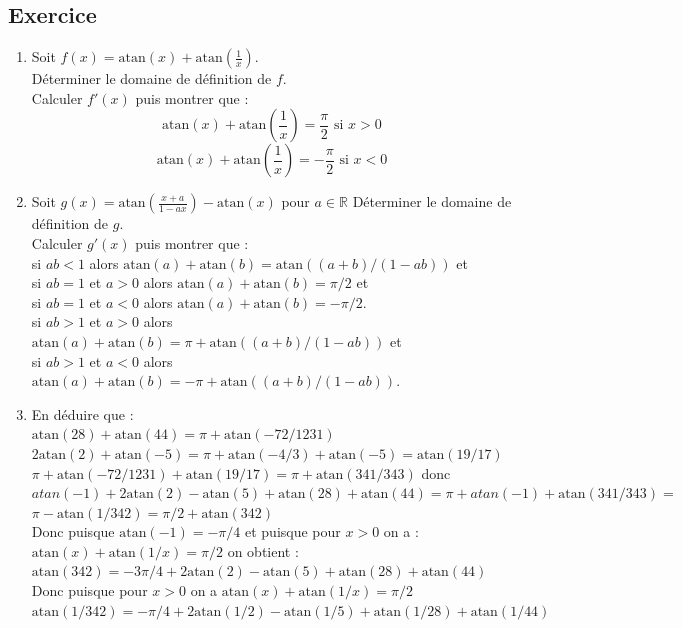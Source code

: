 \documentclass[a4paper,11pt]{book}
\newcommand{\R}{{\mathbb{R}}}
\newcommand{\atan}{\mbox{atan}}
\begin{document}
\subsection{Exercice}
\begin{enumerate}
\item Soit $f(x)=\atan(x)+\atan(\frac{1}{x})$.\\
D\'eterminer le domaine de d\'efinition de $f$.\\
Calculer $f'(x)$ puis montrer que :
$$\atan(x)+\atan(\frac{1}{x})=\frac{\pi}{2} \mbox{ si } x>0$$
$$\atan(x)+\atan(\frac{1}{x})=-\frac{\pi}{2} \mbox{ si } x<0$$
\item Soit $g(x)=\atan(\frac{x+a}{1-ax})-\atan(x)$ pour $a\in \R$
D\'eterminer le domaine de d\'efinition de $g$.\\
Calculer $g'(x)$ puis montrer que :\\
si $ab<1$ alors $\atan(a)+\atan(b)=\atan((a+b)/(1-ab))$ et \\
si $ab=1$ et $a>0$ alors $\atan(a)+\atan(b)=\pi/2$ et\\
si $ab=1$ et $a<0$ alors $\atan(a)+\atan(b)=-\pi/2$.\\
si $ab>1$ et $a>0$ alors $\atan(a)+\atan(b)=\pi+\atan((a+b)/(1-ab))$ et\\
si $ab>1$ et $a<0$ alors $\atan(a)+\atan(b)=-\pi+\atan((a+b)/(1-ab))$.
\item En d\'eduire que :\\
$\atan(28)+\atan(44)=\pi+\atan(-72/1231)$\\
$2\atan(2)+\atan(-5)=\pi+\atan(-4/3)+\atan(-5)=\atan(19/17)$\\
$\pi+\atan(-72/1231)+\atan(19/17)=\pi+\atan(341/343)$ donc\\
$atan(-1)+2\atan(2)-\atan(5)+\atan(28)+\atan(44)=\pi+atan(-1)+\atan(341/343)=$\\
$\pi-\atan(1/342)=\pi/2+\atan(342)$\\
Donc puisque $\atan(-1)=-\pi/4$ et puisque pour $x>0$ on a :\\
$\atan(x)+\atan(1/x)=\pi/2$ on obtient :\\
$\atan(342)=-3\pi/4+2\atan(2)-\atan(5)+\atan(28)+\atan(44)$\\
Donc puisque pour $x>0$ on a $\atan(x)+\atan(1/x)=\pi/2$\\
$\atan(1/342)=-\pi/4+2\atan(1/2)-\atan(1/5)+\atan(1/28)+\atan(1/44)$
\end{enumerate}
\end{document}
